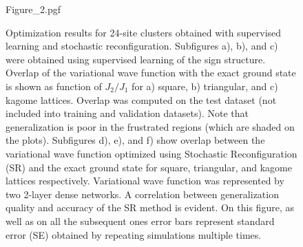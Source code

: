 \begin{figure}[h]
    \centering
    {Figure_2.pgf}
    \caption{Optimization results for 24-site clusters obtained with supervised learning and stochastic reconfiguration. Subfigures a), b), and c) were obtained using supervised learning of the sign structure. Overlap of the variational wave function with the exact ground state is shown as function of $J_2 / J_1$ for a) square, b) triangular, and c) kagome lattices. Overlap was computed on the test dataset (not included into training and validation datasets). Note that generalization is poor in the frustrated regions (which are shaded on the plots).
    Subfigures d), e), and f) show overlap between the variational wave function optimized using Stochastic Reconfiguration (SR) and the exact ground state for square, triangular, and kagome lattices respectively. Variational wave function was represented by two 2-layer dense networks. A correlation between generalization quality and accuracy of the SR method is evident. On this figure, as well as on all the subsequent ones
    error bars represent standard error (SE) obtained by repeating simulations multiple times.}
    \label{fig:nc20:phase_three_models}
\end{figure}


